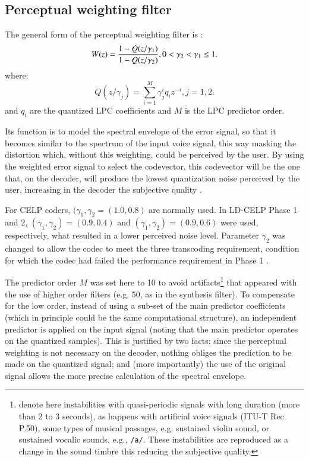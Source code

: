\subsection{Perceptual weighting filter}

The general form of the perceptual weighting filter is \cite{Pond-Percep}:
\[
	W(z)= { 1 - Q(z/\gamma_1) \over 1 - Q(z/\gamma_2) }, 
              0 <\gamma_2<\gamma_1\le1.
\]
where:
\[
     Q(z/\gamma_j) = \sum_{i=1}^M \gamma_j^{i} q_i z^{-i}, j=1,2.
\]
and $q_i$ are the quantized LPC coefficients and $M$ is the LPC
predictor order.

Its function is to model the spectral envelope of the error signal, so
that it becomes similar to the spectrum of the input voice signal,
this way masking the distortion which, without this weighting, could
be perceived by the user. By using the weighted error signal to select
the codevector, this codevector will be the one that, on the decoder,
will produce the lowest quantization noise perceived by the user,
increasing in the decoder the subjective quality \cite{Expl-WeigFilt}.

For CELP coders, $(\gamma_1,\gamma_2=(1.0,0.8)$ are normally used. In
LD-CELP Phase 1 and 2, $(\gamma_1,\gamma_2)=(0.9,0.4)$ and
$(\gamma_1,\gamma_2)=(0.9,0.6)$ were used, respectively, what resulted
in a lower perceived noise level. Parameter $\gamma_2$ was changed to
allow the codec to meet the three transcoding requirement, condition
for which the codec had failed the performance requirement in Phase 1 
\cite{LD-CELP:Exp2-Phase1}.

The predictor order $M$ was set here to 10 to avoid
artifacts\footnote{ denote here instabilities with
quasi-periodic signals with long duration (more than 2 to 3 seconds),
as happens with artificial voice signals (ITU-T Rec. P.50), some types
of musical passages, e.g. sustained violin sound, or sustained vocalic
sounds, e.g., {\tt/a/}. These instabilities are reproduced as a change
in the sound timbre this reducing the subjective quality.} that appeared with the use of higher order
filters (e.g. 50, as in the synthesis filter). To compensate for the
low order, instead of using a sub-set of the main predictor
coefficients (which in principle could be the same computational
structure), an independent predictor is applied on the input signal
(noting that the main predictor operates on the quantized
samples). This is justified by two facts: since the perceptual
weighting is not necessary on the decoder, nothing obliges the
prediction to be made on the quantized signal; and (more importantly)
the use of the original signal allows the more precise calculation of
the spectral envelope.

